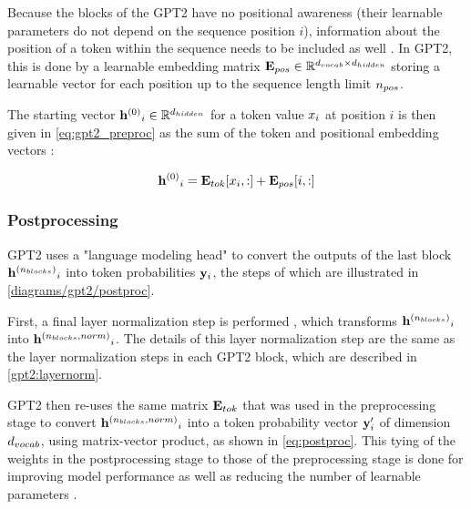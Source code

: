 Because the blocks of the GPT2 have no positional awareness (their learnable parameters do not depend on the sequence position $i$), information about the position of a token within the sequence needs to be included as well .
In GPT2, this is done by a learnable embedding matrix ${\mathbf{E}_{pos}} \in \mathbb{R}^{{d_{vocab}} \times {d_{hidden}}}$ storing a learnable vector for each position up to the sequence length limit ${n_{pos}}$.

The starting vector ${\mathbf{h}^{(0)}}_i \in \mathbb{R}^{d_{hidden}}$ for a token value ${x}_i$ at position $i$ is then given in \cref{eq:gpt2_preproc} as the sum of the token and positional embedding vectors :

\begin{equation}
	{\mathbf{h}^{(0)}}_i = {{\mathbf{E}_{tok}}[{x}_i, :]} + {{\mathbf{E}_{pos}}[i, :]}
	\label{eq:gpt2_preproc}
\end{equation}



\subsubsection{Postprocessing}
\label{gpt2:postproc}

GPT2 uses a "language modeling head" \cite{HuggingFaceGPT2} to convert the outputs of the last block ${\mathbf{h}^{({n_{blocks}})}}_i$ into token probabilities ${\mathbf{y}}_i$, the steps of which are illustrated in \cref{diagrams/gpt2/postproc}.

First, a final layer normalization step is performed , which transforms ${\mathbf{h}^{({n_{blocks}})}}_i$ into ${\mathbf{h}^{({n_{blocks}}, norm)}}_i$. The details of this layer normalization step are  the same as the layer normalization steps in each GPT2 block, which are described in \cref{gpt2:layernorm}.

GPT2 then re-uses the same matrix ${\mathbf{E}_{tok}}$ that was used in the preprocessing stage to convert ${\mathbf{h}^{({n_{blocks}}, norm)}}_i$ into a token probability vector ${\mathbf{y}}'_i$ of dimension ${d_{vocab}}$, using matrix-vector product, as shown in \cref{eq:postproc}.
This tying of the weights in the postprocessing stage to those of the preprocessing stage is done for improving model performance as well as reducing the number of learnable parameters \cite{weightstying}.

